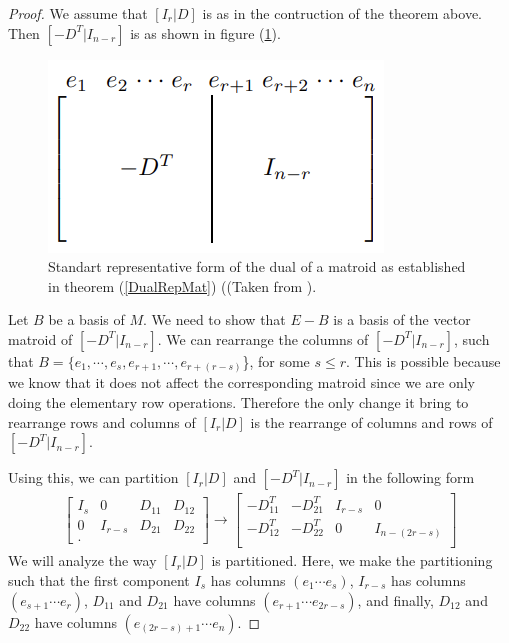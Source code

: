 \begin{proof}
    We assume that $[I_r|D]$ is as in the contruction of the theorem above. Then $[-D^T|I_{n-r}]$ is as shown in figure (\ref{MatRepresentationDual}).
    \begin{figure}[h]
        \centering
        \includegraphics{VMRDual.png}
        \caption{Standart representative form of the dual of a matroid as established in theorem (\ref{DualRepMat}) ((Taken from \cite[p. 78]{oxley1}).}
        \label{MatRepresentationDual}
    \end{figure}

    Let $B$ be a basis of $M$. We need to show that $E-B$ is a basis of the vector matroid of $[-D^T|I_{n-r}]$. We can rearrange the columns of $[-D^T|I_{n-r}]$, such that $B=\{e_1,\cdots,e_s, e_{r+1}, \cdots, e_{r+(r-s)}$\}, for some $s \leq r$. This is possible because we know that it does not affect the corresponding matroid since we are only doing the elementary row operations. Therefore the only change it bring to rearrange rows and columns of $[I_r|D]$ is the rearrange of columns and rows of $[-D^T|I_{n-r}]$. 
    
    Using this, we can partition $[I_r|D]$ and $[-D^T|I_{n-r}]$ in the following form
    \begin{align*}
    \begin{bmatrix}
    I_s & 0 & D_{11} & D_{12}\\
    0 & I_{r-s} & D_{21} & D_{22}\\.
    \end{bmatrix}
         \rightarrow 
    \begin{bmatrix}
    -D_{11}^T & -D_{21}^T & I_{r-s} & 0\\
    -D_{12}^T & -D_{22}^T & 0 & I_{n-(2r-s)}\\
    \end{bmatrix}
    \end{align*}
    We will analyze the way $[I_r|D]$ is partitioned. Here, we make the partitioning such that the first component $I_s$ has columns $(e_1 \cdots e_s)$, $I_{r-s}$ has columns $(e_{s+1} \cdots e_r)$, $D_{11}$ and $D_{21}$ have columns $(e_{r+1} \cdots e_{2r-s})$, and finally, $D_{12}$ and $D_{22}$ have columns $(e_{(2r-s)+1} \cdots e_n)$.
    

\end{proof}
